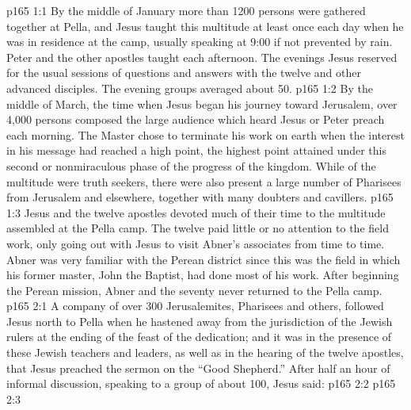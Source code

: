\vs p165 1:1 By the middle of January more than 1200 persons were gathered together at Pella, and Jesus taught this multitude at least once each day when he was in residence at the camp, usually speaking at 9:00 if not prevented by rain. Peter and the other apostles taught each afternoon. The evenings Jesus reserved for the usual sessions of questions and answers with the twelve and other advanced disciples. The evening groups averaged about 50.
\vs p165 1:2 By the middle of March, the time when Jesus began his journey toward Jerusalem, over 4,000 persons composed the large audience which heard Jesus or Peter preach each morning. The Master chose to terminate his work on earth when the interest in his message had reached a high point, the highest point attained under this second or nonmiraculous phase of the progress of the kingdom. While  of the multitude were truth seekers, there were also present a large number of Pharisees from Jerusalem and elsewhere, together with many doubters and cavillers.
\vs p165 1:3 Jesus and the twelve apostles devoted much of their time to the multitude assembled at the Pella camp. The twelve paid little or no attention to the field work, only going out with Jesus to visit Abner’s associates from time to time. Abner was very familiar with the Perean district since this was the field in which his former master, John the Baptist, had done most of his work. After beginning the Perean mission, Abner and the seventy never returned to the Pella camp.
\vs p165 2:1 A company of over 300 Jerusalemites, Pharisees and others, followed Jesus north to Pella when he hastened away from the jurisdiction of the Jewish rulers at the ending of the feast of the dedication; and it was in the presence of these Jewish teachers and leaders, as well as in the hearing of the twelve apostles, that Jesus preached the sermon on the “Good Shepherd.” After half an hour of informal discussion, speaking to a group of about 100, Jesus said:
\vs p165 2:2 \pc {}
\vs p165 2:3 
